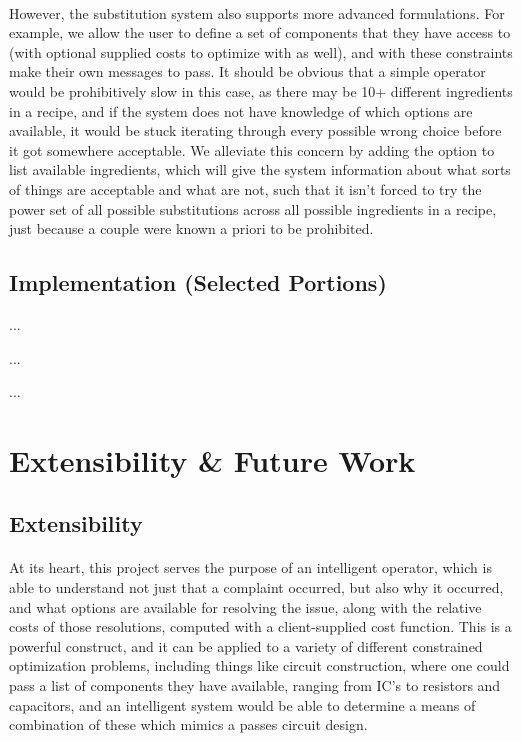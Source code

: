 \paragraph{}
However, the substitution system also supports more advanced formulations. For example, we allow the user to define a set of components that they have access to (with optional supplied costs to optimize with as well), and with these constraints make their own messages to pass. It should be obvious that a simple  operator would be prohibitively slow in this case, as there may be 10+ different ingredients in a recipe, and if the system does not have knowledge of which options are available, it would be stuck iterating through every possible wrong choice before it got somewhere acceptable. We alleviate this concern by adding the option to list available ingredients, which will give the system information about what sorts of things are acceptable and what are not, such that it isn't forced to try the power set of all possible substitutions across all possible ingredients in a recipe, just because a couple were known a priori to be prohibited.

\subsection{Implementation (Selected Portions)}
...

...

...

\newpage
\section{Extensibility \& Future Work}
\subsection{Extensibility}
\paragraph{}
At its heart, this project serves the purpose of an intelligent  operator, which is able to understand not just that a complaint occurred, but also why it occurred, and what options are available for resolving the issue, along with the relative costs of those resolutions, computed with a client-supplied cost function. This is a powerful construct, and it can be applied to a variety of different constrained optimization problems, including things like circuit construction, where one could pass a list of components they have available, ranging from IC's to resistors and capacitors, and an intelligent system would be able to determine a means of combination of these which mimics a passes circuit design.

